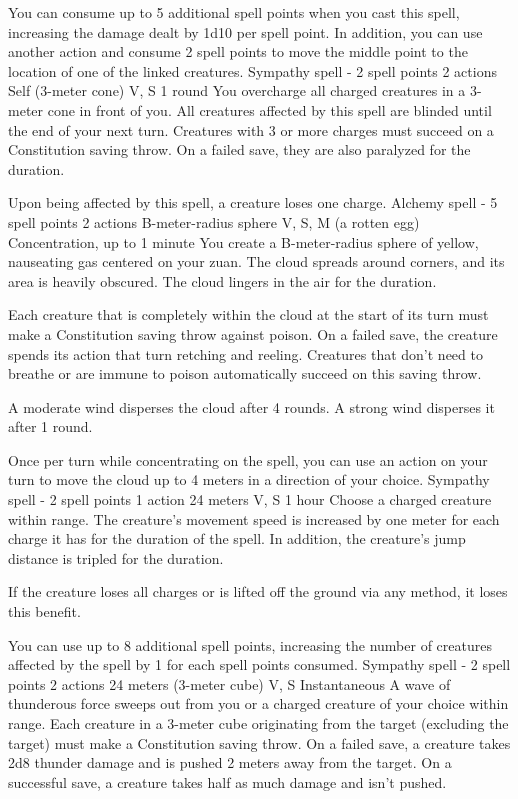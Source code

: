     You can consume up to 5 additional spell points when you cast this spell, increasing the damage dealt by 1d10 per spell point.
    In addition, you can use another action and consume 2 spell points to move the middle point to the location of one of the linked creatures.
    {Sympathy spell - 2 spell points}
    {2 actions}
    {Self (3-meter cone)}
    {V, S}
    {1 round}
    You overcharge all charged creatures in a 3-meter cone in front of you.
    All creatures affected by this spell are blinded until the end of your next turn.
    Creatures with 3 or more charges must succeed on a Constitution saving throw.
    On a failed save, they are also paralyzed for the duration.

    Upon being affected by this spell, a creature loses one charge.
    {Alchemy spell - 5 spell points}
    {2 actions}
    {B-meter-radius sphere}
    {V, S, M (a rotten egg)}
    {Concentration, up to 1 minute}
    You create a B-meter-radius sphere of yellow, nauseating gas centered on your zuan.
    The cloud spreads around corners, and its area is heavily obscured.
    The cloud lingers in the air for the duration.

    Each creature that is completely within the cloud at the start of its turn must make a Constitution saving throw against poison.
    On a failed save, the creature spends its action that turn retching and reeling.
    Creatures that don't need to breathe or are immune to poison automatically succeed on this saving throw.

    A moderate wind disperses the cloud after 4 rounds.
    A strong wind disperses it after 1 round.

    Once per turn while concentrating on the spell, you can use an action on your turn to move the cloud up to 4 meters in a direction of your choice.
    {Sympathy spell - 2 spell points}
    {1 action}
    {24 meters}
    {V, S}
    {1 hour}
    Choose a charged creature within range.
    The creature's movement speed is increased by one meter for each charge it has for the duration of the spell.
    In addition, the creature's jump distance is tripled for the duration.

    If the creature loses all charges or is lifted off the ground via any method, it loses this benefit.

    You can use up to 8 additional spell points, increasing the number of creatures affected by the spell by 1 for each spell points consumed.
    {Sympathy spell - 2 spell points}
    {2 actions}
    {24 meters (3-meter cube)}
    {V, S}
    {Instantaneous}
    A wave of thunderous force sweeps out from you or a charged creature of your choice within range.
    Each creature in a 3-meter cube originating from the target (excluding the target) must make a Constitution saving throw.
    On a failed save, a creature takes 2d8 thunder damage and is pushed 2 meters away from the target.
    On a successful save, a creature takes half as much damage and isn't pushed.

